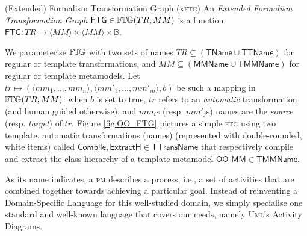 \begin{Definition}{(Extended) Formalism Transformation Graph (x\textsc{ftg})}
An \emph{Extended Formalism Transformation Graph} $\mathsf{FTG} \in \mathbb{F}\mskip-1mu\mathbb{T}\mskip-1mu\mathbb{G}(TR, 
MM)$ is a function  $\mathsf{FTG} \colon TR \to \langle MM \rangle \times 
\langle MM \rangle \times \mathbb{B}$.
\end{Definition}
\noindent
We parameterise $\mathbb{F}\mskip-1mu\mathbb{T}\mskip-1mu\mathbb{G}$ with two sets of names $TR\subseteq (\mathsf{TName}\cup 
\mathsf{TTName})$ for regular or template transformations, and $MM\subseteq 
(\mathsf{MMName} \cup \mathsf{TMMName})$ for regular or template metamodels. 
Let $tr \mapsto (\langle mm_1, \ldots, mm_n \rangle, \langle mm'_1, \ldots, 
mm'_m \rangle, b)$ be such a mapping in $\mathbb{F}\mskip-1mu\mathbb{T}\mskip-1mu\mathbb{G}(TR, MM)$: when $b$ is
set to true, $tr$ refers to an \emph{automatic} transformation (and human 
guided otherwise); and $mm_i$s (resp. $mm'_j$s) names are the \emph{source} 
(resp. \emph{target}) of $tr$.
%
%
Figure \ref{fig:OO_FTG} pictures a simple \textsc{ftg} using two template, 
automatic transformations (names) (represented with double-rounded, white 
items) called $\mathsf{Compile}, \mathsf{ExtractH}\in 
\mathsf{TTransName}$ that respectively compile and extract the class hierarchy 
of a template metamodel $\mathsf{OO\_MM}\in\mathsf{TMMName}$. 

\medskip
As its name indicates, a \textsc{pm} describes a process, i.e., a set of 
activities that are combined together towards achieving a particular goal. 
Instead of reinventing a Domain-Specific Language for this well-studied domain, 
we simply specialise one standard and well-known language that covers our 
needs, namely \textsc{Uml}'s Activity Diagrams.


